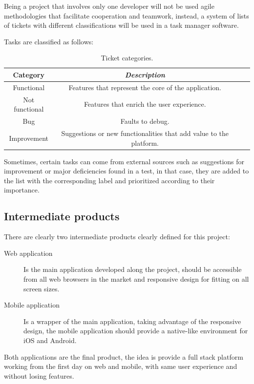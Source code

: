 \documentclass{DeustoFDP}
\begin{document}
Being a project that involves only one developer will not be used agile methodologies that facilitate cooperation and teamwork, instead, a system of lists of tickets with different classifications will be used in a task manager software.

Tasks are classified as follows:
\begin{table}[H]
	\centering
	\caption{Ticket categories.}\label{tab:ticketcategories}
	\begin{tabular}{cccc}
		\toprule
		\textbf{Category} & \emph{Description}\\
		\midrule
		Functional  & Features that represent the core of the application.\\
		Not functional   & Features that enrich the user experience.\\
		Bug & Faults to debug.\\
		Improvement & Suggestions or new functionalities that add value to the platform.\\
		\bottomrule
	\end{tabular}
\end{table}

Sometimes, certain tasks can come from external sources such as suggestions for improvement or major deficiencies found in a test, in that case, they are added to the list with the corresponding label and prioritized according to their importance.
\subsection{Intermediate products}
There are clearly two intermediate products clearly defined for this project:

\begin{description}
	\item[Web application] Is the main application developed along the project, should be accessible from all web browsers in the market and responsive design for fitting on all screen sizes. 
	\item[Mobile application] Is a wrapper of the main application, taking advantage of the responsive design, the mobile application should provide a native-like environment for iOS and Android.
\end{description}

Both applications are the final product, the idea is provide a full stack platform working from the first day on web and mobile, with same user experience and without losing features. 
\newpage
\end{document}
